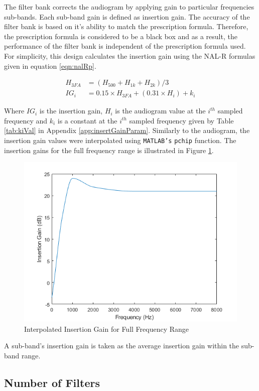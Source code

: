 \documentclass[11pt,onecolumn]{witseiepaper}
\begin{document}
\noindent The filter bank corrects the audiogram by applying gain to particular frequencies sub-bands. Each sub-band gain is defined as insertion gain. The accuracy of the filter bank is based on it's ability to match the prescription formula. Therefore, the prescription formula is considered to be a black box and as a result, the performance of the filter bank is independent of the prescription formula used. For simplicity, this design calculates the insertion gain using the NAL-R formulas given in equation \ref{eqn:nalRp}.

\begin{equation}
\label{eqn:nalRp}
\begin{aligned}
H_{3FA} &= (H_{500} + H_{1k} + H_{2k})/3 \\
IG_i &= 0.15 \times H_{3FA} + (0.31\times H_i) + k_i
\end{aligned}
\end{equation}

\noindent Where $IG_i$ is the insertion gain, $H_i$ is the audiogram value at the $i^{th}$ sampled frequency and $k_i$ is a constant at the $i^{th}$ sampled frequency given by Table \ref{tab:kiVal} in Appendix \ref{app:insertGainParam}. Similarly to the audiogram, the insertion gain values were interpolated using \texttt{MATLAB's} \texttt{pchip} function. The insertion gains for the full frequency range is illustrated in Figure \ref{fig:igFreqRange}. 

\begin{figure}[h]
\centering
\includegraphics[width=0.6\linewidth]{igFreqRange.PNG}
\caption{Interpolated Insertion Gain for Full Frequency Range}
\label{fig:igFreqRange}
\end{figure}  

\noindent A sub-band's insertion gain is taken as the average insertion gain within the sub-band range.

\subsection{Number of Filters} 
\label{sec:numFreqBands}
\end{document}
